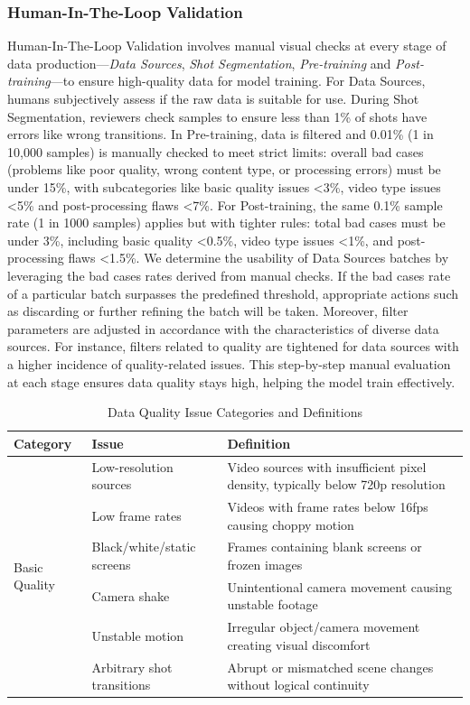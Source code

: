 \documentclass{article}
\begin{document}
{\subsubsection{Human-In-The-Loop Validation}
Human-In-The-Loop Validation involves manual visual checks at every stage of data production—\emph{Data Sources}, \emph{Shot Segmentation}, \emph{Pre-training} and \emph{Post-training}—to ensure high-quality data for model training. For Data Sources, humans subjectively assess if the raw data is suitable for use. During Shot Segmentation, reviewers check samples to ensure less than 1\% of shots have errors like wrong transitions. In Pre-training, data is filtered and 0.01\% (1 in 10,000 samples) is manually checked to meet strict limits: overall bad cases (problems like poor quality, wrong content type, or processing errors) must be under 15\%, with subcategories like basic quality issues <3\%, video type issues <5\% and post-processing flaws <7\%. For Post-training, the same 0.1\% sample rate (1 in 1000 samples) applies but with tighter rules: total bad cases must be under 3\%, including basic quality <0.5\%, video type issues <1\%, and post-processing flaws <1.5\%. 
We determine the usability of Data Sources batches by leveraging the bad cases rates derived from manual checks. If the bad cases rate of a particular batch surpasses the predefined threshold, appropriate actions such as discarding or further refining the batch will be taken. Moreover, filter parameters are adjusted in accordance with the characteristics of diverse data sources. For instance, filters related to quality are tightened for data sources with a higher incidence of quality-related issues. This step-by-step manual evaluation at each stage ensures data quality stays high, helping the model train effectively.

\begin{table}[t]
\centering
\caption{Data Quality Issue Categories and Definitions}
\label{tab:quality_issues}
\begin{tabular}{lp{4cm}p{7cm}}
\toprule
\textbf{Category} & \textbf{Issue} & \textbf{Definition} \\
\midrule
\multirow{6}{*}{Basic Quality} 
& Low-resolution sources & Video sources with insufficient pixel density, typically below 720p resolution \\
& Low frame rates & Videos with frame rates below 16fps causing choppy motion \\
& Black/white/static screens & Frames containing blank screens or frozen images \\
& Camera shake & Unintentional camera movement causing unstable footage \\
& Unstable motion & Irregular object/camera movement creating visual discomfort \\
& Arbitrary shot transitions & Abrupt or mismatched scene changes without logical continuity \\
\midrule


\end{tabular}
\end{table}}
\end{document}
